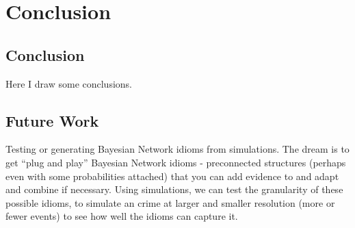  

\chapter[Conclusion]{Conclusion}

\section{Conclusion}
Here I draw some conclusions.

\section{Future Work}
Testing or generating Bayesian Network idioms from simulations. The dream is to get ``plug and play'' Bayesian Network idioms - preconnected structures (perhaps even with some probabilities attached) that you can add evidence to and adapt and combine if necessary. Using simulations, we can test the granularity of these possible idioms, to simulate an crime at larger and smaller resolution (more or fewer events) to see how well the idioms can capture it.
